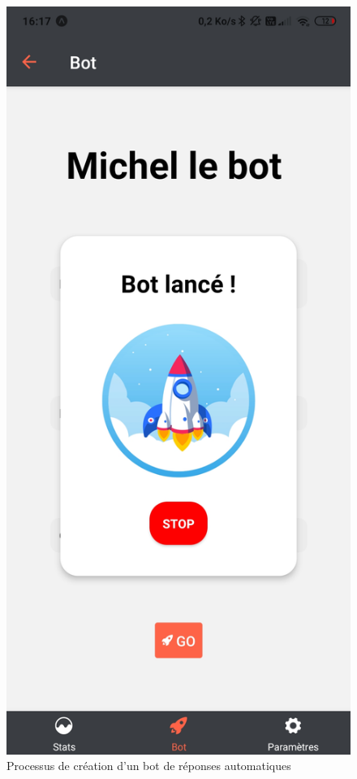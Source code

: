 \documentclass{article}
\begin{document}
\begin{figure}[h!]
\includegraphics[scale=0.1]{images/lancement_bot2.jpg}
\caption{Processus de création d'un bot de réponses automatiques}
\label{fig:Processus de création d'un bot de réponses automatique}
\end{figure}
\end{document}
